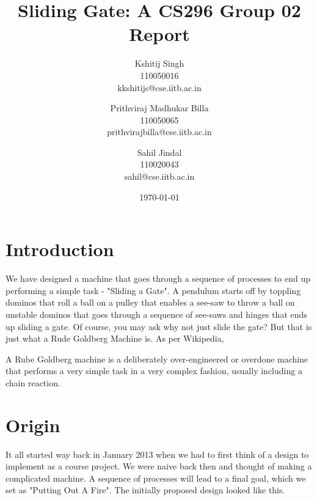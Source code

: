 \documentclass[a4paper,11pt]{article}
\begin{document}
\title{\textbf{Sliding Gate: A CS296 Group 02 Report}}

\author{
Kshitij Singh\\
110050016\\
kkshitijs@cse.iitb.ac.in
\and
Prithviraj Madhukar Billa\\
110050065\\
prithvirajbilla@cse.iitb.ac.in
\and
Sahil Jindal\\
110020043\\
sahil@cse.iitb.ac.in
}

\date{\today}
\maketitle

\setlength{\parindent}{0 cm}
\section{Introduction}

We have designed a machine that goes through a sequence of processes to end up performing a simple task - "Sliding a Gate". A pendulum starts off by toppling dominos that roll a ball on a pulley that enables a see-saw to throw a ball on unstable dominos that goes through a sequence of see-saws and hinges that ends up sliding a gate. Of course, you may ask why not just slide the gate? But that is just what a Rude Goldberg Machine is. As per Wikipedia,

A Rube Goldberg machine is a deliberately over-engineered or overdone machine that performs a very simple task in a very complex fashion, usually including a chain reaction. 

\section{Origin}

It all started way back in January 2013 when we had to first think of a design to implement as a course project. We were naive back then and thought of making a complicated machine. A sequence of processes will lead to a final goal, which we set as "Putting Out A Fire". The initially proposed design looked like this.
\end{document}
